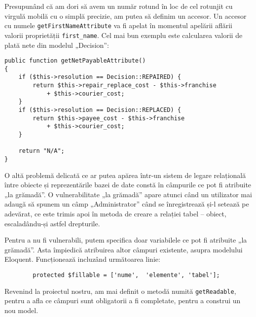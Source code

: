 	Presupunând că am dori să avem un număr rotund în loc de cel rotunjit cu virgulă mobilă cu o simplă precizie, am putea să definim un accesor.
	Un accesor cu numele \verb|getFirstNameAttribute| va fi apelat în momentul apelării aflării valorii proprietății \verb|first_name|.
	Cel mai bun exemplu este calcularea valorii de plată nete din modelul „Decision”:
\begin{Verbatim}
public function getNetPayableAttribute()
{
    if ($this->resolution == Decision::REPAIRED) {
        return $this->repair_replace_cost - $this->franchise
            + $this->courier_cost;
    }
    if ($this->resolution == Decision::REPLACED) {
        return $this->payee_cost - $this->franchise
            + $this->courier_cost;
    }

    return "N/A";
}
\end{Verbatim}

	O altă problemă delicată ce ar putea apărea într-un sistem de legare relațională între obiecte și reprezentările bazei de date constă în câmpurile ce pot fi atribuite „la grămadă”.
	O vulnerabilitate „la grămadă” apare atunci când un utilizator mai adaugă să spunem un câmp „Administrator” când se înregistrează și-l setează pe adevărat, ce este trimis apoi în metoda de creare a relației tabel -- obiect, escaladându-și astfel drepturile.

	Pentru a nu fi vulnerabili, putem specifica doar variabilele ce pot fi atribuite „la grămadă”.
	Asta împiedică atribuirea altor câmpuri existente, asupra modelului Eloquent.
	Funcționează incluzând următoarea linie:
	\begin{verbatim}
		protected $fillable = ['nume',  'elemente', 'tabel'];
	\end{verbatim}

	Revenind la proiectul nostru, am mai definit o metodă numită \verb|getReadable|, pentru a afla ce câmpuri sunt obligatorii a fi completate, pentru a construi un nou model.

